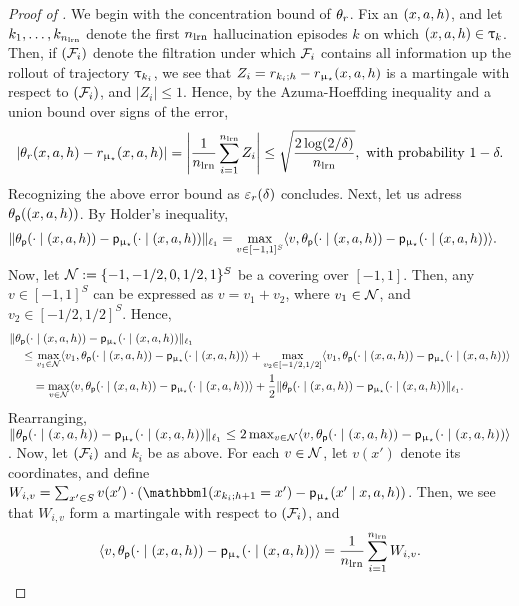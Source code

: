 \begin{proof}[Proof of ]
We begin with the concentration bound of $\theta_r$.  Fix an $(x,a,h)$, and let $k_1,\dots,k_{n_{\mathrm{lrn}}}$ denote the first $n_{\mathrm{lrn}}$ hallucination episodes $k$ on which $(x,a,h) \in {\uptau}_k$. Then, if $(\mathcal{F}_{i})$ denote the filtration under which $\mathcal{F}_i$ contains all information up the rollout of trajectory ${\uptau}_{k_i}$, we see that $Z_i= r_{k_i;h} - r_{\upmu_{\star}}(x,a,h)$ is a martingale with respect to $(\mathcal{F}_i)$, and $|Z_i| \le 1$. Hence, by the Azuma-Hoeffding inequality and a union bound over signs of the error,
	\begin{align*}
	|\theta_r(x,a,h) - r_{\upmu_{\star}}(x,a,h)| = \left|\frac{1}{n_{\mathrm{lrn}}} \sum_{i=1}^{n_{\mathrm{lrn}}} Z_i\right| \le \sqrt{ \frac{2\log(2/\delta)}{n_{\mathrm{lrn}}}}, \text{ with probability } 1-\delta.
	\end{align*}
	Recognizing the above error bound as $\varepsilon_{r}(\delta)$ concludes. Next, let us adress $\theta_{\mathsf{p}}((x,a,h))$. By Holder's inequality,
	\begin{align*}
	\|\theta_{\mathsf{p}}(\cdot \mid (x,a,h)) - \mathsf{p}_{\upmu_{\star}}(\cdot \mid (x,a,h))\|_{\ell_1} &= \max_{v\in [-1,1]^S} \langle v, \theta_{\mathsf{p}}(\cdot \mid (x,a,h)) - \mathsf{p}_{\upmu_{\star}}(\cdot \mid (x,a,h))\rangle.
	\end{align*}
	Now, let $\mathcal{N} := \{-1,-1/2,0,1/2,1\}^S$ be a covering over $[-1,1]$. Then, any $v \in [-1,1]^S$ can be expressed as $v = v_1 + v_2$, where $v_1 \in \mathcal{N}$, and $v_2 \in [-1/2,1/2]^S$. Hence,
	\begin{align}
	&\|\theta_{\mathsf{p}}(\cdot \mid (x,a,h)) - \mathsf{p}_{\upmu_{\star}}(\cdot \mid (x,a,h))\|_{\ell_1} \\
	&\quad \le \max_{v_1\in \mathcal{N}} \langle v_1, \theta_{\mathsf{p}}(\cdot \mid (x,a,h)) \nonumber - \mathsf{p}_{\upmu_{\star}}(\cdot \mid (x,a,h))\rangle + \max_{v_2\in [-1/2,1/2]} \langle v_1, \theta_{\mathsf{p}}(\cdot \mid (x,a,h)) - \mathsf{p}_{\upmu_{\star}}(\cdot \mid (x,a,h))\rangle \nonumber\\
	&\qquad=  \max_{v\in \mathcal{N}} \langle v, \theta_{\mathsf{p}}(\cdot \mid (x,a,h)) - \mathsf{p}_{\upmu_{\star}}(\cdot \mid (x,a,h))\rangle + \frac{1}{2}\|\theta_{\mathsf{p}}(\cdot \mid (x,a,h)) - \mathsf{p}_{\upmu_{\star}}(\cdot \mid (x,a,h))\|_{\ell_1}. \label{eq:cover_eq}
	\end{align}
	Rearranging, $\|\theta_{\mathsf{p}}(\cdot \mid (x,a,h)) - \mathsf{p}_{\upmu_{\star}}(\cdot \mid (x,a,h))\|_{\ell_1}  \le 2 \max_{v\in \mathcal{N}} \langle v, \theta_{\mathsf{p}}(\cdot \mid (x,a,h)) - \mathsf{p}_{\upmu_{\star}}(\cdot \mid (x,a,h))\rangle$.
	Now, let $(\mathcal{F}_i)$ and $k_i$ be as above. For each $v \in \mathcal{N}$, let $v(x')$ denote its coordinates, and define $W_{i,v}= \sum_{x'\in S} v(x') \cdot (\ind(x_{k_i;h+1} =x') - \pmodst(x' \mid x,a,h))$. Then, we see that $W_{i,v}$ form a martingale with respect to $(\mathcal{F}_i)$, and
	\begin{align*}
	\langle v, \thetap(\cdot \mid \xah) - \pmodst(\cdot \mid \xah)\rangle = \frac{1}{\nlearn}\sum_{i=1}^{\nlearn} W_{i,v}.

\end{align*}
\end{proof}
